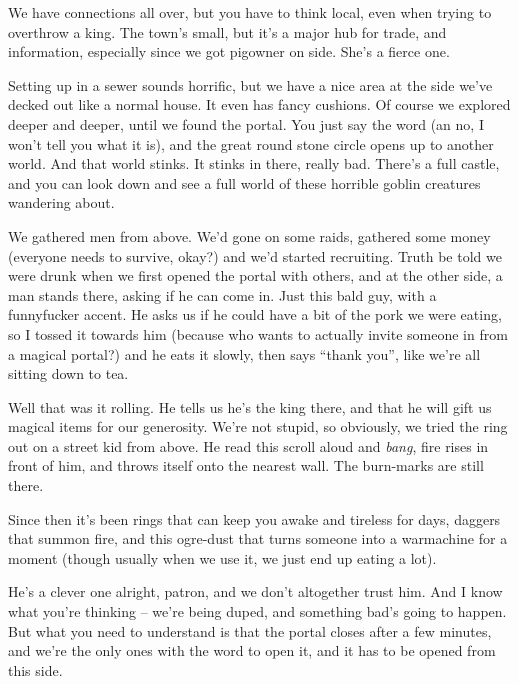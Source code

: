 \begin{speechtext}

We have connections all over, but you have to think local, even when trying to overthrow a king.  The town's small, but it's a major hub for trade, and information, especially since we got \gls{pigowner} on side.  She's a fierce one.

Setting up in a sewer sounds horrific, but we have a nice area at the side we've decked out like a normal house.  It even has fancy cushions.  Of course we explored deeper and deeper, until we found the portal.  You just say the word (an no, I won't tell you what it is), and the great round stone circle opens up to another world.  And that world stinks.  It stinks in there, really bad.  There's a full castle, and you can look down and see a full world of these horrible goblin creatures wandering about.

We gathered men from above.  We'd gone on some raids, gathered some money (everyone needs to survive, okay?) and we'd started recruiting.  Truth be told we were drunk when we first opened the portal with others, and at the other side, a man stands there, asking if he can come in.  Just this bald guy, with a funnyfucker accent.  He asks us if he could have a bit of the pork we were eating, so I tossed it towards him (because who wants to actually invite someone in from a magical portal?) and he eats it slowly, then says ``thank you'', like we're all sitting down to tea.

Well that was it rolling.  He tells us he's the king there, and that he will gift us magical items for our generosity.  We're not stupid, so obviously, we tried the ring out on a street kid from above.  He read this scroll aloud and \emph{bang}, fire rises in front of him, and throws itself onto the nearest wall.  The burn-marks are still there.

Since then it's been rings that can keep you awake and tireless for days, daggers that summon fire, and this ogre-dust that turns someone into a warmachine for a moment (though usually when we use it, we just end up eating a lot).

He's a clever one alright, \gls{patron}, and we don't altogether trust him.  And I know what you're thinking -- we're being duped, and something bad's going to happen.  But what you need to understand is that the portal closes after a few minutes, and we're the only ones with the word to open it, and it has to be opened from this side.

\end{speechtext}


